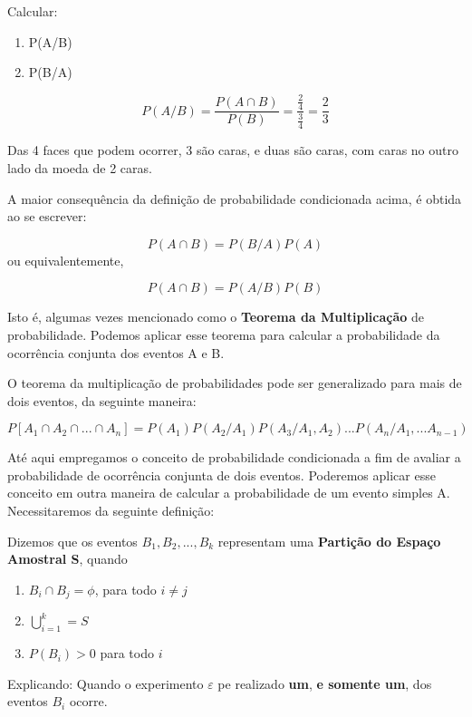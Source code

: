\documentclass[a4paper,12pt]{report}
\begin{document}
{\vskip0.3cm

Calcular:

\begin{enumerate}
    \item P(A/B)
    \item P(B/A)
\end{enumerate}


$$P(A/B)=\frac{P(A \cap
B)}{P(B)}=\frac{\frac{2}{4}}{\frac{3}{4}} = \frac{2}{3}$$

Das 4 faces que podem ocorrer, 3 são caras, e duas são caras, com
caras no outro lado da moeda de 2 caras.\vskip0.3cm


A maior consequência da definição de probabilidade condicionada
acima, é obtida ao se escrever:


$$
P(A \cap B)= P(B/A)P(A)
$$
 ou equivalentemente,

$$
P(A \cap B)= P(A/B)P(B)
$$

Isto é, algumas vezes mencionado como o \textbf{Teorema da
Multiplicação} de probabilidade. Podemos aplicar esse teorema para
calcular a probabilidade da ocorrência conjunta dos eventos A e B.
\vskip0.3cm

O teorema da multiplicação de probabilidades pode ser generalizado
para mais de dois eventos, da seguinte maneira:

\begin{equation}\label{}
    P[A_{1} \cap A_{2} \cap ... \cap A_{n}]=
    P(A_{1})P(A_{2}/A_{1})P(A_{3}/A_{1},A_{2})...P(A_{n}/A_{1},...A_{n-1})
\end{equation}

Até aqui empregamos o conceito de probabilidade condicionada a fim
de avaliar a probabilidade de ocorrência conjunta de dois eventos.
Poderemos aplicar esse conceito em outra maneira de calcular a
probabilidade de um evento simples A. Necessitaremos da seguinte
definição:\vskip0.3cm


Dizemos que os eventos $B_{1},B_{2},...,B_{k}$ representam uma
\textbf{Partição do Espaço Amostral S}, quando


\begin{enumerate}
    \item $B_{i} \cap B_{j}=\phi$, para todo $i\neq j$
    \item $\bigcup^{k}_{i=1}=S$
    \item $P(B_{i})>0$ para todo $i$
\end{enumerate}

Explicando: Quando o experimento $\varepsilon$ pe realizado
\textbf{um}, \textbf{e somente um}, dos eventos $B_{i}$
ocorre.\vskip0.3cm

}
\end{document}
